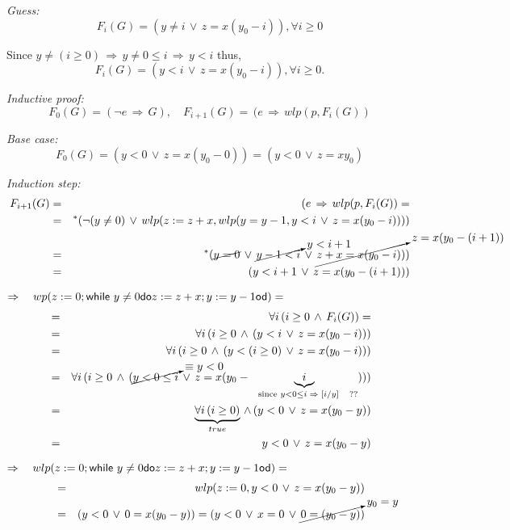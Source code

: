 \textit{Guess:}\\%
\begin{equation*}
F_{i}(G)=(y\neq i\,\vee \,z=x(y_{0}-i)),\forall i\geq 0
\end{equation*}

Since $y\neq (i\geq 0)\,\Rightarrow \,y\neq 0\leq i\,\Rightarrow \,y<i$
thus,%
\begin{equation*}
F_{i}(G)=(y<i\,\vee \,z=x(y_{0}-i)),\forall i\geq 0.
\end{equation*}

\textit{Inductive proof:}%
\begin{equation*}
F_{0}(G)=(\lnot e\,\Rightarrow \,G),\quad F_{i+1}(G)=\,(e\,\Rightarrow
\,wlp(p,F_{i}(G))
\end{equation*}

\textit{Base case:}%
\begin{equation*}
F_{0}(G)=(y<0\,\vee \,z=x(y_{0}-0))=(y<0\,\vee \,z=xy_{0})
\end{equation*}

\textit{Induction step:}%
\begin{eqnarray*}
F_{i+1}(G) &=&\,(e\,\Rightarrow \,wlp(p,F_{i}(G))= \\
&=&^{\ast }(\lnot (y\neq 0)\,\vee \,wlp(z:=z+x,wlp(y=y-1,y<i\,\vee
\,z=x(y_{0}-i)))) \\
&=&^{\ast }(\cancel{y=0}\,\vee \,\cancelto{y<i+1}{y-1<i}\,\vee \,%
\cancelto{z=x(y_{0}-(i+1))}{z+x=x(y_{0}-i))}) \\
&=&(y<i+1\,\vee \,z=x(y_{0}-(i+1)))
\end{eqnarray*}

$\Rightarrow \quad wp(\ASS z0;\WHILE\ y\neq 0\DO\ASS z{z+x};\ASS y{y-1}%
\OD)=$%
\begin{eqnarray*}
&=&\forall i\,(i\geq 0\,\wedge \,F_{i}(G))= \\
&=&\forall i\,(i\geq 0\,\wedge \,(y<i\,\vee \,z=x(y_{0}-i))) \\
&=&\forall i\,(i\geq 0\,\wedge \,(y<(i\geq 0)\,\vee \,z=x(y_{0}-i))) \\
&=&\forall i\,(i\geq 0\,\wedge \,(\cancelto{\equiv y<0}{y<0\leq i}\,\vee
\,z=x(y_{0}-\underbrace{i}_{\text{since }y<0\leq i\;\Rightarrow \;[i/y]\text{
??}}))) \\
&=&\underbrace{\forall i\,(i\geq 0)}_{true}\,\wedge \,(y<0\,\vee
\,z=x(y_{0}-y)) \\
&=&y<0\,\vee \,z=x(y_{0}-y)
\end{eqnarray*}

$\Rightarrow \quad wlp(\ASS z0;\WHILE\ y\neq 0\DO\ASS z{z+x};\ASS y{y-1%
}\OD)=$%
\begin{eqnarray}
&=&wlp(z:=0,y<0\,\vee \,z=x(y_{0}-y))  \notag \\
&=&(y<0\,\vee \,0=x(y_{0}-y))=(y<0\,\vee \,x=0\,\vee \,%
\cancelto{y_{0}=y}{0=(y_{0}-y)})  \label{wlp_rule}
\end{eqnarray}

